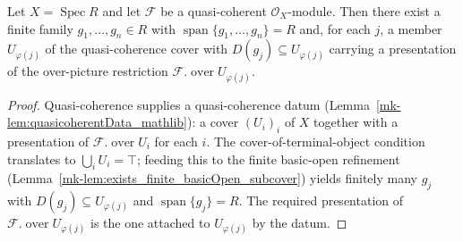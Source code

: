 \begin{lemma}
  \label{mk-lem:qcoh_finite_presentation_cover}

  Let \(X = \operatorname{Spec} R\) and let \(\mathcal{F}\) be a quasi-coherent
  \(\mathcal{O}_X\)-module. Then there exist a finite family \(g_1, \ldots, g_n \in R\) with
  \(\operatorname{span}\{g_1, \ldots, g_n\} = R\) and, for each \(j\), a member \(U_{\varphi(j)}\) of
  the quasi-coherence cover with \(D(g_j) \subseteq U_{\varphi(j)}\) carrying a presentation of the
  over-picture restriction \(\mathcal{F}.\operatorname{over} U_{\varphi(j)}\).
\end{lemma}
\begin{proof}
  Quasi-coherence supplies a quasi-coherence datum (Lemma~\ref{mk-lem:quasicoherentData_mathlib}): a cover
  \((U_i)_i\) of \(X\) together with a presentation of \(\mathcal{F}.\operatorname{over} U_i\) for each
  \(i\). The cover-of-terminal-object condition translates to \(\bigcup_i U_i = \top\); feeding this to
  the finite basic-open refinement (Lemma~\ref{mk-lem:exists_finite_basicOpen_subcover}) yields finitely
  many \(g_j\) with \(D(g_j) \subseteq U_{\varphi(j)}\) and \(\operatorname{span}\{g_j\} = R\). The
  required presentation of \(\mathcal{F}.\operatorname{over} U_{\varphi(j)}\) is the one attached to
  \(U_{\varphi(j)}\) by the datum.
\end{proof}

